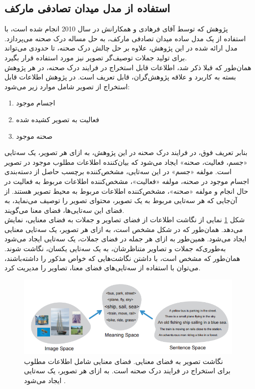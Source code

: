 \subsection[استفاده از مدل میدان تصادفی مارکف]{استفاده از مدل میدان تصادفی مارکف\cite{Farhadi2010every}}
پژوهش 
\cite{Farhadi2010every}
که توسط آقای فرهادی و همکارانش در سال 2010 انجام شده است، با استفاده از یک مدل ساده میدان تصادفی مارکف، به حل مساله درک صحنه می‌پردازد. مدل ارائه شده در این پژوهش، علاوه بر حل چالش درک صحنه، تا حدودی می‌تواند برای تولید جملات توصیف‌گر تصویر نیز مورد استفاده قرار بگیرد.
\\
همان‌طور که قبلا ذکر شد، اطلاعات قابل استخراج در فرایند درک صحنه، در هر پژوهش بسته به کاربرد و علاقه پژوهش‌گران، قابل تعریف است. در پژوهش \cite{Farhadi2010every} اطلاعات قابل استخراج از تصویر شامل موارد زیر می‌شود:
\begin{enumerate}
	\item اجسام موجود
	\item فعالیت به تصویر کشیده شده
	\item صحنه موجود
\end{enumerate}
بنابر تعریف فوق، در فرایند درک صحنه در این پژوهش، به ازای هر تصویر، یک سه‌تایی «جسم، فعالیت، صحنه»
ایجاد می‌شود که بیان‌کننده اطلاعات مطلوب موجود در تصویر است. مولفه «جسم» در این سه‌تایی، مشخص‌کننده‌ برچسب حاصل از دسته‌بندی اجسام موجود در صحنه، مولفه «فعالیت»، مشخص‌کننده اطلاعات مربوط به فعالیت در حال انجام و مولفه «صحنه»، مشخص‌کننده اطلاعات مربوط به محیط تصویر هستند. از آن‌جایی که هر سه‌تایی مربوط به یک تصویر، محتوای تصویر را توصیف می‌نماید، به فضای این سه‌تایی‌ها، فضای معنا می‌گویند.
\\
شکل
\ref{fig:F2010EF1}
نمایی از نگاشت اطلاعات از فضای تصاویر و جملات به فضای معنایی، نمایش می‌دهد. همان‌طور که در شکل مشخص است، به ازای هر تصویر، یک سه‌تایی معنایی ایجاد می‌شود. همین‌طور به ازای هر جمله در فضای جملات، یک سه‌تایی ایجاد می‌شود به‌طوری‌که جملات و تصاویر متناظرشان، به یک سه‌تایی یکسان، نگاشت شوند. همان‌طور که مشخص است، با داشتن نگاشت‌هایی  که خواص مذکور را داشته‌باشند، می‌توان با استفاده از سه‌تایی‌های فضای معنا، تصاویر را مدیریت کرد.

\begin{figure}[h]
	\center
	\includegraphics[scale=0.6]{./Imgs/farhadi2010every_fig1.png}
	\caption[نگاشت تصویر به فضای معنایی]{
		نگاشت تصویر به فضای معنایی. فضای معنایی شامل اطلاعات مطلوب برای استخراج در فرایند درک صحنه است. به ازای هر تصویر، یک سه‌تایی ایجاد می‌شود
		\cite{Farhadi2010every}.
	}
	\label{fig:F2010EF1}
\end{figure}

